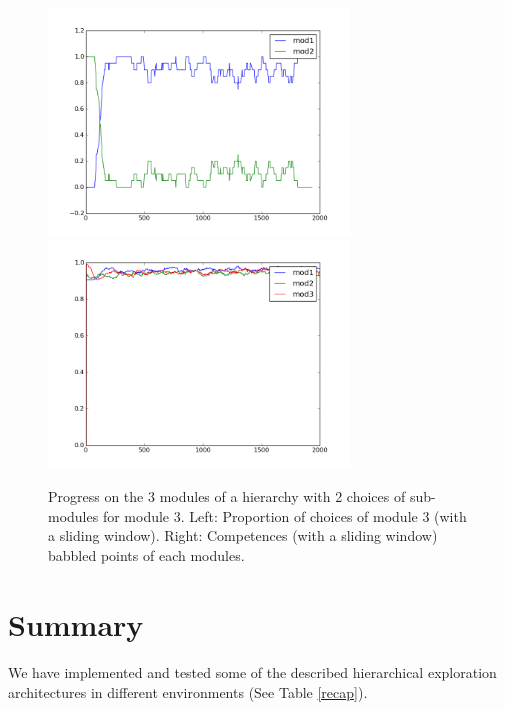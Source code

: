 \documentclass[12pt]{article}
\begin{document}
		\begin{figure}[H]
			\centering
			\includegraphics[width=8cm]{./include/choice_test_choices.png}
			\includegraphics[width=8cm]{./include/choice_test_competences.png}
			\caption{Progress on the 3 modules of a hierarchy with 2 choices of sub-modules for module 3. Left: Proportion of choices of module 3 (with a sliding window). Right: Competences (with a sliding window) babbled points of each modules.}
			\label{fchoices}
		\end{figure}
		
	


%

\section{Summary}

	\paragraph{}%
	We have implemented and tested some of the described hierarchical exploration architectures in different environments (See Table \ref{recap}).
	
\end{document}
